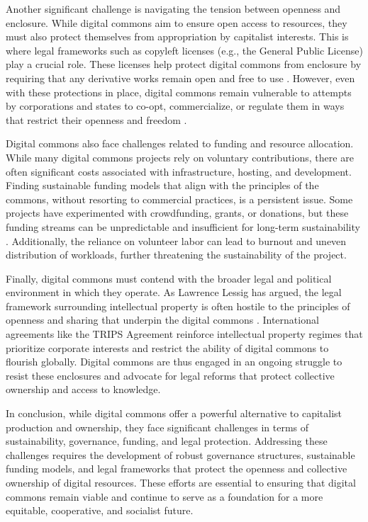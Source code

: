\begin{refsection}
Another significant challenge is navigating the tension between openness and enclosure. While digital commons aim to ensure open access to resources, they must also protect themselves from appropriation by capitalist interests. This is where legal frameworks such as copyleft licenses (e.g., the General Public License) play a crucial role. These licenses help protect digital commons from enclosure by requiring that any derivative works remain open and free to use \cite[pp.~47-48]{stallman2010}. However, even with these protections in place, digital commons remain vulnerable to attempts by corporations and states to co-opt, commercialize, or regulate them in ways that restrict their openness and freedom \cite[pp.~34-35]{drahos2002}.

Digital commons also face challenges related to funding and resource allocation. While many digital commons projects rely on voluntary contributions, there are often significant costs associated with infrastructure, hosting, and development. Finding sustainable funding models that align with the principles of the commons, without resorting to commercial practices, is a persistent issue. Some projects have experimented with crowdfunding, grants, or donations, but these funding streams can be unpredictable and insufficient for long-term sustainability \cite[pp.~67-69]{benkler2010}. Additionally, the reliance on volunteer labor can lead to burnout and uneven distribution of workloads, further threatening the sustainability of the project.

Finally, digital commons must contend with the broader legal and political environment in which they operate. As Lawrence Lessig has argued, the legal framework surrounding intellectual property is often hostile to the principles of openness and sharing that underpin the digital commons \cite[pp.~105-107]{lessig2019}. International agreements like the TRIPS Agreement reinforce intellectual property regimes that prioritize corporate interests and restrict the ability of digital commons to flourish globally. Digital commons are thus engaged in an ongoing struggle to resist these enclosures and advocate for legal reforms that protect collective ownership and access to knowledge.

In conclusion, while digital commons offer a powerful alternative to capitalist production and ownership, they face significant challenges in terms of sustainability, governance, funding, and legal protection. Addressing these challenges requires the development of robust governance structures, sustainable funding models, and legal frameworks that protect the openness and collective ownership of digital resources. These efforts are essential to ensuring that digital commons remain viable and continue to serve as a foundation for a more equitable, cooperative, and socialist future.


\end{refsection}

